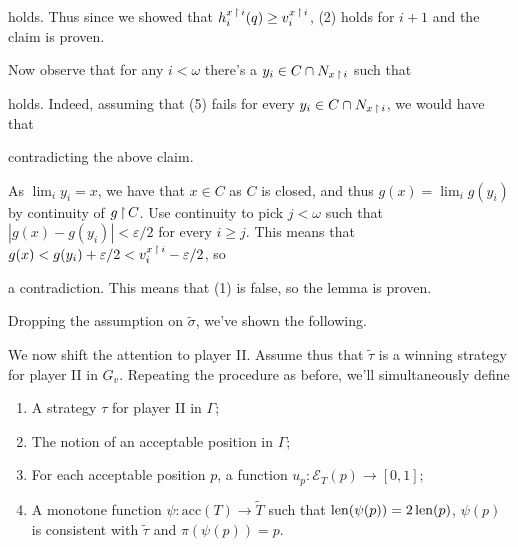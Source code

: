 {{holds. Thus since we showed that $h_i^{x\operatorname{\upharpoonright} i}(q)\geq v_i^{x\operatorname{\upharpoonright} i}$, (2) holds for $i+1$ and the claim is proven.
}

Now observe that for any $i<\omega$ there's a $y_i\in C\cap N_{x\operatorname{\upharpoonright} i}$ such that

holds. Indeed, assuming that (5) fails for every $y_i\in C\cap N_{x\operatorname{\upharpoonright} i}$, we would have that

contradicting the above claim.

\qquad As $\lim_i y_i=x$, we have that $x\in C$ as $C$ is closed, and thus $g(x)=\lim_i g(y_i)$ by continuity of $g\operatorname{\upharpoonright} C$. Use continuity to pick $j<\omega$ such that $|g(x)-g(y_i)|<\varepsilon/2$ for every $i\geq j$. This means that $g(x)<g(y_i)+\varepsilon/2<v_i^{x\operatorname{\upharpoonright} i}-\varepsilon/2$, so

a contradiction. This means that (1) is false, so the lemma is proven.
}


Dropping the assumption on $\tilde\sigma$, we've shown the following.



We now shift the attention to player II. Assume thus that $\tilde\tau$ is a winning strategy for player II in $G_v$. Repeating the procedure as before, we'll simultaneously define
\begin{enumerate}
\item A strategy $\tau$ for player II in $\Gamma$;
\item The notion of an acceptable position in $\Gamma$;
\item For each acceptable position $p$, a function $u_p:\mathcal{E}_T(p)\to[0,1]$;
\item A monotone function $\psi:\text{acc}(T)\to\tilde T$ such that $\operatorname{len}(\psi(p))=2\operatorname{len}(p)$, $\psi(p)$ is consistent with $\tilde\tau$ and $\pi(\psi(p))=p$.\\
\end{enumerate}

